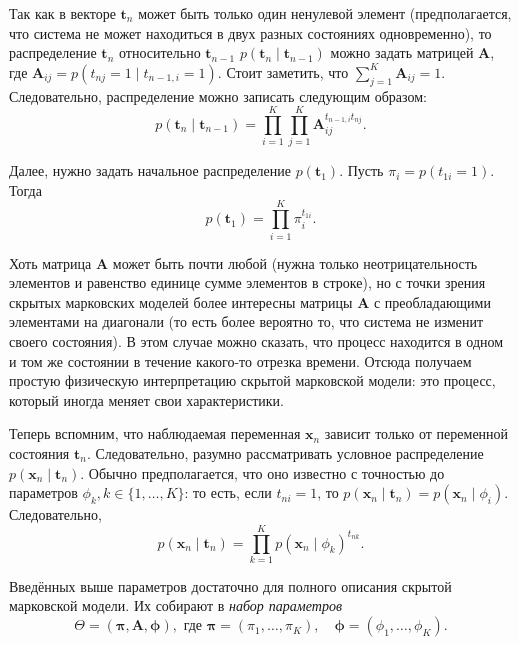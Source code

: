 Так как в векторе \(\mathbf{t}_{n}\) может быть только один ненулевой элемент 
(предполагается, что система не может находиться в двух разных состояниях 
одновременно), то распределение \(\mathbf{t}_{n}\) относительно \(\mathbf{t}_{n 
- 1}\) \(p(\mathbf{t}_{n} \mid \mathbf{t}_{n - 1})\) можно задать матрицей 
\(\mathbf{A}\), где \(\mathbf{A}_{ij} = p(t_{nj} = 1 \mid t_{n - 1,i} = 1)\). 
Стоит заметить, что \(\sum_{j = 1}^{K} \mathbf{A}_{ij} = 1\). Следовательно, 
распределение можно записать следующим образом:
\[
	p(\mathbf{t}_{n} \mid \mathbf{t}_{n - 1}) = \prod_{i = 1}^{K}\prod_{j = 
	1}^{K} \mathbf{A}_{ij}^{t_{n - 1, i}t_{nj}}.
\]

Далее, нужно задать начальное распределение \(p(\mathbf{t}_{1})\). Пусть 
\(\pi_{i} = p(t_{1i} = 1)\). Тогда
\[
	p(\mathbf{t}_{1}) = \prod_{i = 1}^{K} \pi_{i}^{t_{1i}}.
\]

Хоть матрица \(\mathbf{A}\) может быть почти любой (нужна только 
неотрицательность элементов и равенство единице сумме элементов в строке), но с 
точки зрения скрытых марковских моделей более интересны матрицы \(\mathbf{A}\) 
с преобладающими элементами на диагонали (то есть более вероятно то, что 
система не изменит своего состояния). В этом случае можно сказать, что процесс 
находится в одном и том же состоянии в течение какого-то отрезка времени. 
Отсюда получаем простую физическую интерпретацию скрытой марковской модели: это 
процесс, который иногда меняет свои характеристики.

Теперь вспомним, что наблюдаемая переменная \(\mathbf{x}_{n}\) зависит только 
от переменной состояния \(\mathbf{t}_{n}\). Следовательно, разумно 
рассматривать условное распределение \(p(\mathbf{x}_{n} \mid \mathbf{t}_{n})\). 
Обычно предполагается, что оно известно с точностью до параметров \(\phi_{k}, k 
\in \{1, \ldots, K\}\): то есть, если \(t_{ni} = 1\), то \(p(\mathbf{x}_{n} 
\mid \mathbf{t}_{n}) = p(\mathbf{x}_{n} \mid \phi_{i})\). Следовательно,
\[
	p(\mathbf{x}_{n} \mid \mathbf{t}_{n}) = \prod_{k = 1}^{K} p(\mathbf{x}_{n} 
	\mid \phi_{k})^{t_{nk}}.
\]

Введённых выше параметров достаточно для полного описания скрытой марковской 
модели. Их собирают в \emph{набор параметров}
\[
	\Theta = (\bm{\pi}, \mathbf{A}, \bm{\phi}), \text{ где } \bm{\pi} = 
	(\pi_{1}, \ldots, \pi_{K}), \quad \bm{\phi} = (\phi_{1}, \ldots, \phi_{K}).
\]

